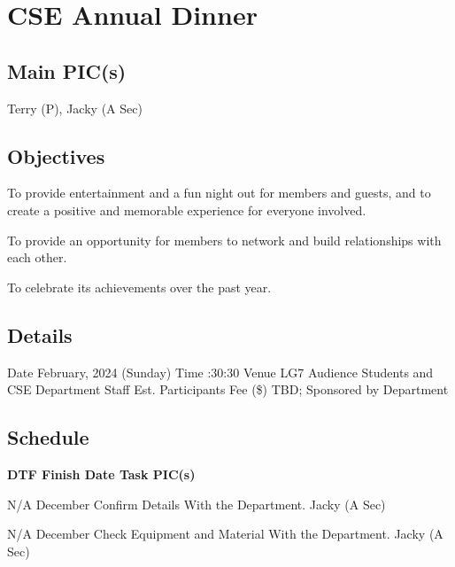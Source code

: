 \section{CSE Annual Dinner}

\subsection{Main PIC(s)}
Terry (P), Jacky (A Sec)

\subsection{Objectives}
\startitemize
\item To provide entertainment and a fun night out for members and guests, and to create a positive and memorable experience for everyone involved.
\item To provide an opportunity for members to network and build relationships with each other.
\item To celebrate its achievements over the past year.
\stopitemize

\subsection{Details}
\starttabulate[|rB|l|]
\NC Date
 February, 2024 (Sunday) \NR
\NC Time
:30:30 \NR
\NC Venue
\NC LG7 \NR
\NC Audience
\NC Students and CSE Department Staff \NR
\NC Est. Participants
 \NR
\NC Fee (\$)
\NC TBD; Sponsored by Department \NR
\stoptabulate

\subsection{Schedule}

\setupTABLE[c][1][width=0.75in]
\setupTABLE[c][2][width=1in]
\setupTABLE[c][3][width=3in]
\setupTABLE[c][4][width=1.25in]
\bTABLE
\bTABLEhead

\bTR\bTH    \bf{DTF}
\eTH\bTH    \bf{Finish Date}
\eTH\bTH    \bf{Task}
\eTH\bTH    \bf{PIC(s)}
\eTH\eTR

\eTABLEhead
\bTABLEbody

\bTR\bTD N/A
\eTD{} December
\eTD\bTD Confirm Details With the Department.
\eTD\bTD Jacky (A Sec)
\eTD\eTR

\bTR\bTD N/A
\eTD{} December
\eTD\bTD Check Equipment and Material With the Department.
\eTD\bTD Jacky (A Sec)
\eTD\eTR

